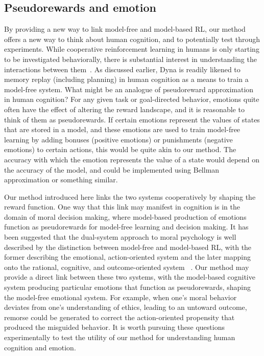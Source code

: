 \documentclass[letterpaper]{article}
\begin{document}
\subsection{Pseudorewards and emotion}

By providing a new way to link model-free and model-based RL, our method offers a new way to think about human cognition, and to potentially test through experiments. While cooperative reinforcement learning in humans is only starting to be investigated behaviorally, there is substantial interest in understanding the interactions between them~\cite{daw2014algorithmic}. As discussed earlier, Dyna is readily likened to memory replay (including planning) in human cognition as a means to train a model-free system. What might be an analogue of pseudoreward approximation in human cognition? For any given task or goal-directed behavior, emotions quite often have the effect of altering the reward landscape, and it is reasonable to think of them as pseudorewards. If certain emotions represent the values of states that are stored in a model, and these emotions are used to train model-free learning by adding bonuses (positive emotions) or punishments (negative emotions) to certain actions, this would be quite akin to our method. The accuracy with which the emotion represents the value of a state would depend on the accuracy of the model, and could be implemented using Bellman approximation or something similar.

Our method introduced here links the two systems cooperatively by shaping the reward function. One way that this link may manifest in cognition is in the domain of moral decision making, where model-based production of emotions function as pseudorewards for model-free learning and decision making. It has been suggested that the dual-system approach to moral psychology is well described by the distinction between model-free and model-based RL, with the former describing the emotional, action-oriented system and the later mapping onto the rational, cognitive, and outcome-oriented system ~\cite{cushman2013action, crockett2013models}. Our method may provide a direct link between these two systems, with the model-based cognitive system producing particular emotions that function as pseudorewards, shaping the model-free emotional system. For example, when one's moral behavior deviates from one's understanding of ethics, leading to an untoward outcome, remorse could be generated to correct the action-oriented propensity that produced the misguided behavior. It is worth pursuing these questions experimentally to test the utility of our method for understanding human cognition and emotion.

{}

\end{document}
